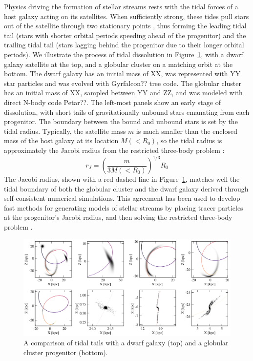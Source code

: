 \documentclass[final,5p,times,twocolumn,authoryear]{elsarticle}
\begin{document}
Physics driving the formation of stellar streams rests with the tidal forces of a host galaxy acting on its satellites.
When sufficiently strong, these tides pull stars out of the satellite through two stationary points \citep{bt:2008}, thus forming the leading tidal tail (stars with shorter orbital periods speeding ahead of the progenitor) and the trailing tidal tail (stars lagging behind the progenitor due to their longer orbital periods).
We illustrate the process of tidal dissolution in Figure~\ref{fig:stream_formation}, with a dwarf galaxy satellite at the top, and a globular cluster on a matching orbit at the bottom.
The dwarf galaxy has an initial mass of XX, was represented with YY star particles and was evolved with Gyrfalcon?? tree code.
The globular cluster has an initial mass of XX, sampled between YY and ZZ, and was modeled with direct N-body code Petar??.
The left-most panels show an early stage of dissolution, with short tails of gravitationally unbound stars emanating from each progenitor.
The boundary between the bound and unbound stars is set by the tidal radius.
Typically, the satellite mass $m$ is much smaller than the enclosed mass of the host galaxy at its location $M(<R_0)$, so the tidal radius is approximately the Jacobi radius from the restricted three-body problem \citep[][]{szebehely:1967, valtonen:2006}:
\begin{equation}
r_J = \left(\frac{m}{3M(<R_0)}\right)^{1/3} R_0
\end{equation}
The Jacobi radius, shown with a red dashed line in Figure~\ref{fig:stream_formation}, matches well the tidal boundary of both the globular cluster and the dwarf galaxy derived through self-consistent numerical simulations.
This agreement has been used to develop fast methods for generating models of stellar streams by placing tracer particles at the progenitor's Jacobi radius, and then solving the restricted three-body problem \citep[the so-called \emph{particle-spray methods};][]{varghese:2011, lane:2012, kuepper:2012, bonaca:2014, gibson:2014, fardal:2015}.

\begin{figure}[t!]
\begin{center}
\includegraphics[width=1\textwidth]{figures/stream_formation.png}
\end{center}
\caption{%
A comparison of tidal tails with a dwarf galaxy (top) and a globular cluster progenitor (bottom).
\label{fig:stream_formation}
}
\end{figure}
\end{document}
